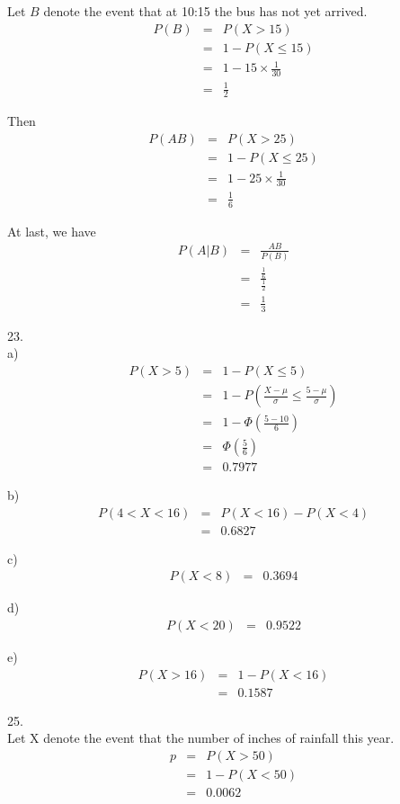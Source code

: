 \documentclass[12pt]{article}
\begin{document}
Let $B$ denote the event that at 10:15 the bus has not yet arrived.
\begin{eqnarray*}
  P(B)
  &=& P(X > 15) \\
  &=& 1 - P(X \le 15) \\
  &=& 1 - 15 \times \frac {1}{30} \\
  &=& \frac {1}{2}
\end{eqnarray*}

Then 
\begin{eqnarray*}
  P(AB)
  &=& P(X > 25) \\
  &=& 1 - P(X \le 25) \\
  &=& 1 - 25 \times \frac {1}{30} \\
  &=& \frac {1}{6}
\end{eqnarray*}

At last, we have
\begin{eqnarray*}
  P(A|B)
  &=& \frac {AB}{P(B)} \\
  &=& \frac {\frac {1}{6}}{\frac {1}{2}} \\
  &=& \frac {1}{3}
\end{eqnarray*}

23. \\
a)
\begin{eqnarray*}
  P(X>5)
  &=& 1 - P(X \le 5) \\
  &=& 1 - P(\frac {X-\mu}{\sigma} \le \frac {5-\mu}{\sigma}) \\
  &=& 1- \Phi(\frac {5-10}{6}) \\
  &=& \Phi(\frac {5}{6}) \\
  &=& 0.7977
\end{eqnarray*}

b) 
\begin{eqnarray*}
  P(4 < X < 16)
  &=& P(X < 16) - P(X < 4) \\
  &=& 0.6827
\end{eqnarray*}

c)
\begin{eqnarray*}
  P(X < 8)
  &=& 0.3694
\end{eqnarray*}

d) 
\begin{eqnarray*}
  P(X < 20)
  &=& 0.9522
\end{eqnarray*}

e)
\begin{eqnarray*}
  P(X > 16)
  &=& 1 - P(X < 16) \\
  &=& 0.1587
\end{eqnarray*}

25. \\
Let X denote the event that the number of inches of rainfall this year.
\begin{eqnarray*}
  p
  &=& P(X>50) \\
  &=& 1 - P(X<50) \\
  &=& 0.0062
\end{eqnarray*}
\end{document}
